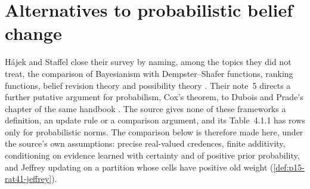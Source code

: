 \section{Alternatives to probabilistic belief change}
\label{sec:p15-w02b-p15-022-alternatives}

H\'ajek and Staffel close their survey by naming, among the topics they did
not treat, the comparison of Bayesianism with Dempster--Shafer functions,
ranking functions, belief revision theory and possibility theory
\cite[p.~248]{HajekStaffel2021Dynamics}. Their note~5 directs a further
putative argument for probabilism, Cox's theorem, to Dubois and Prade's
chapter of the same handbook \cite[p.~248, n.~5]{HajekStaffel2021Dynamics}.
The source gives none of these frameworks a definition, an update rule or a
comparison argument, and its Table~4.1.1 has rows only for probabilistic
norms. The comparison below is therefore made here, under the source's own
assumptions: precise real-valued credences, finite additivity, conditioning
on evidence learned with certainty and of positive prior probability, and
Jeffrey updating on a partition whose cells have positive old weight
(\cref{def:p15-rat41-jeffrey}).


